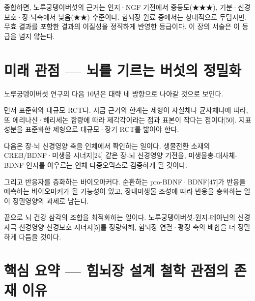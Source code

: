 \documentclass[12pt,oneside]{book}
\begin{document}
종합하면, 노루궁뎅이버섯의 근거는 인지·NGF 기전에서 중등도(★★★), 기분·신경보호·장-뇌축에서 낮음(★★) 수준이다. 힘뇌장 원료 중에서는 상대적으로 두텁지만, 무효 결과를 포함한 결과의 이질성을 정직하게 반영한 등급이다. 이 장의 서술은 이 등급을 넘지 않는다.

\section{미래 관점 — 뇌를 기르는 버섯의 정밀화}

노루궁뎅이버섯 연구의 다음 10년은 대략 네 방향으로 나아갈 것으로 보인다.

먼저 표준화와 대규모 RCT다. 지금 근거의 한계는 제형이 자실체냐 균사체냐에 따라, 또 에리나신·헤리세논 함량에 따라 제각각이라는 점과 표본이 작다는 점이다[50]. 지표성분을 표준화한 제형으로 대규모·장기 RCT를 밟아야 한다.

다음은 장-뇌 신경영양 축을 인체에서 확인하는 일이다. 생물전환 소재의 CREB/BDNF·미생물 시너지[24] 같은 장-뇌 신경영양 기전을, 미생물총-대사체-BDNF-인지를 아우르는 인체 다중오믹스로 검증하게 될 것이다.

그리고 반응자를 층화하는 바이오마커다. 순환하는 pro-BDNF·BDNF[47]가 반응을 예측하는 바이오마커가 될 가능성이 있고, 장내미생물 조성에 따라 반응을 층화하는 일이 정밀영양의 과제로 남는다.

끝으로 뇌 건강 삼각의 조합을 최적화하는 일이다. 노루궁뎅이버섯-원지-테아닌의 신경자극-신경영양-신경보호 시너지[5]를 정량화해, 힘뇌장 연결·평정 축의 배합을 더 정밀하게 다듬을 것이다.

\section{핵심 요약 — 힘뇌장 설계 철학 관점의 존재 이유}
\end{document}
